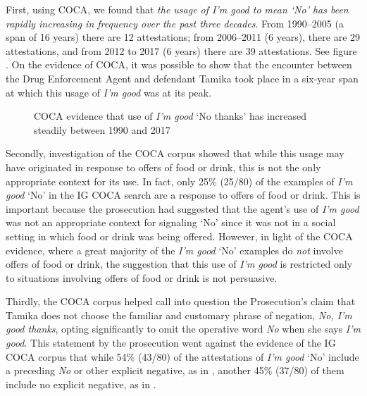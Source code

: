 \documentclass[output=paper,colorlinks,citecolor=brown]{langscibook}
\begin{document}
First, using COCA, we found that \textit{the usage of \textit{I'm good} to mean `No' has been rapidly increasing in frequency over the past three decades}. From 1990--2005 (a span of 16 years) there are 12 attestations; from 2006--2011 (6 years), there are 29 attestations, and from 2012 to 2017 (6 years) there are 39 attestations. See figure .  On the evidence of COCA, it was possible to show that the encounter between the Drug Enforcement Agent and defendant Tamika took place in a six-year span at which this usage of \textit{I'm good} was at its peak.
 
 \begin{figure}
\caption{COCA evidence that use of \textit{I'm good} `No thanks' has increased steadily between 1990 and 2017\label{fig:rickford:6}}
 \end{figure}

Secondly, investigation of the COCA corpus showed that while this usage may have originated in response to offers of food or drink, this is not the only appropriate context for its use. In fact, only 25\% (25/80) of the examples of \textit{I'm good} `No' in the IG COCA search are a response to offers of food or drink.  This is important because the prosecution had suggested that the agent's use of \textit{I'm good} was not an appropriate context for signaling `No' since it was not in a social setting in which food or drink was being offered. However, in light of the COCA evidence, where a great majority of the \textit{I'm good} `No' examples do \emph{not} involve offers of food or drink, the suggestion that this use of \textit{I'm good} is restricted only to situations involving offers of food or drink is not persuasive.

Thirdly, the COCA corpus helped call into question the Prosecution's claim that Tamika does not choose the familiar and customary phrase of negation, \textit{No, I'm good thanks}, opting significantly to omit the operative word \textit{No} when she says \textit{I'm good}. This statement by the prosecution went against the evidence of the IG COCA corpus that while 54\% (43/80) of the attestations of \textit{I'm good} `No' include a preceding \textit{No} or other explicit negative, as in , another 45\% (37/80) of them include no explicit negative, as in .
\end{document}
